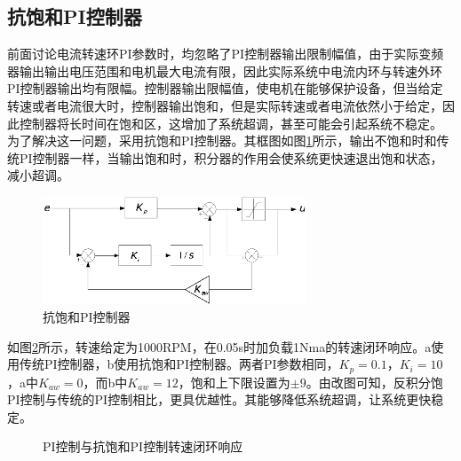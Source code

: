 \subsection{抗饱和PI控制器}
前面讨论电流转速环PI参数时，均忽略了PI控制器输出限制幅值，由于实际变频器输出输出电压范围和电机最大电流有限，因此实际系统中电流内环与转速外环PI控制器输出均有限幅。控制器输出限幅值，使电机在能够保护设备，但当给定转速或者电流很大时，控制器输出饱和，但是实际转速或者电流依然小于给定，因此控制器将长时间在饱和区，这增加了系统超调，甚至可能会引起系统不稳定。
为了解决这一问题，采用抗饱和PI控制器。其框图如图\ref{fig:antiwindup_pi}所示，输出不饱和时和传统PI控制器一样，当输出饱和时，积分器的作用会使系统更快速退出饱和状态，减小超调\cite{antiwindup,antiwindup1,anti_windup_2}。
\begin{figure}[H]
	\centering
	\includegraphics[width=0.7\textwidth]{figs/antiwindup_pi.eps}
	\caption{抗饱和PI控制器}
	\label{fig:antiwindup_pi}
\end{figure}
如图\ref{fig:pi_speed_loop}所示，转速给定为1000RPM，在0.05s时加负载1Nma的转速闭环响应。a使用传统PI控制器，b使用抗饱和PI控制器。两者PI参数相同，$K_{p}=0.1$，$K_{i}=10$，a中$K_{aw}=0$，而b中$K_{aw}=12$，饱和上下限设置为$\pm 9$。由改图可知，反积分饱PI控制与传统的PI控制相比，更具优越性。其能够降低系统超调，让系统更快稳定。
\begin{figure} [h]
	\centering%
	\hspace{2em}%
	\caption{PI控制与抗饱和PI控制转速闭环响应}
	\label{fig:pi_speed_loop}
\end{figure}
